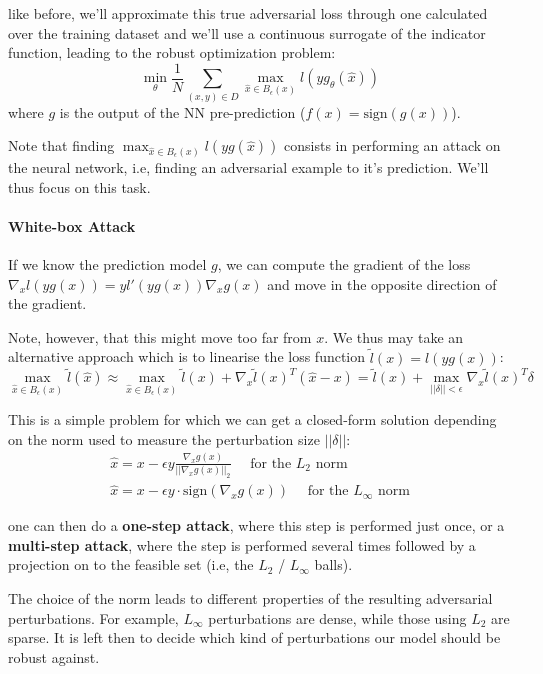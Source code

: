 \documentclass{article}
\begin{document}
like before, we'll approximate this true adversarial loss through one calculated over the training dataset and we'll use a continuous surrogate of the indicator function, leading to the robust optimization problem:
$$
\min_\theta \frac{1}{N} \sum_{(x,y) \in D} \max_{\hat{x} \in B_\epsilon(x)} l(y g_\theta(\hat{x}))
$$
where $g$ is the output of the NN pre-prediction ($f(x) = \text{sign}(g(x))$).

Note that finding $\max_{\hat{x} \in B_\epsilon(x)} l(y g(\hat{x}))$ consists in performing an attack on the neural network, i.e, finding an adversarial example to it's prediction.
We'll thus focus on this task.

\paragraph{White-box Attack}

If we know the prediction model $g$, we can compute the gradient of the loss $\nabla_x l(yg(x)) = yl'(yg(x)) \nabla_x g(x)$ and move in the opposite direction of the gradient.

Note, however, that this might move too far from $x$.
We thus may take an alternative approach which is to linearise the loss function $\tilde{l}(x) = l(yg(x))$:
$$
\max_{\hat{x} \in B_\epsilon(x)} \tilde{l}(\hat{x}) \approx
\max_{\hat{x} \in B_\epsilon(x)} \tilde{l}(x) + \nabla_x \tilde{l}(x)^T (\hat{x} - x) =
\tilde{l}(x) + \max_{||\delta|| < \epsilon} \nabla_x \tilde{l}(x)^T \delta
$$

This is a simple problem for which we can get a closed-form solution depending on the norm used to measure the perturbation size $||\delta||$:
\begin{gather*}
\hat{x} = x - \epsilon y \frac{\nabla_x g(x)}{|| \nabla_x g(x) ||_2} \quad \text{ for the } L_2 \text{ norm} \\
\hat{x} = x - \epsilon y \cdot \text{sign}( \nabla_x g(x) ) \quad \text{ for the } L_\infty \text{ norm} 
\end{gather*}

one can then do a \textbf{one-step attack}, where this step is performed just once, or a \textbf{multi-step attack}, where the step is performed several times followed by a projection on to the feasible set (i.e, the $L_2$ / $L_\infty$ balls).

The choice of the norm leads to different properties of the resulting adversarial perturbations.
For example, $L_\infty$ perturbations are dense, while those using $L_2$ are sparse.
It is left then to decide which kind of perturbations our model should be robust against.
\end{document}
